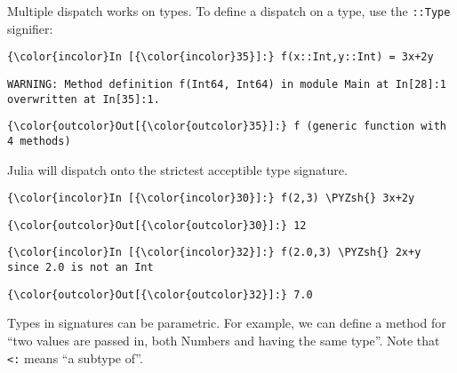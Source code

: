 \documentclass[11pt]{article}
\def\PYZsh{\char`\#}
\begin{document}
Multiple dispatch works on types. To define a dispatch on a type, use
the \texttt{::Type} signifier:

    \begin{Verbatim}[commandchars=\\\{\}]
{\color{incolor}In [{\color{incolor}35}]:} f(x::Int,y::Int) = 3x+2y
\end{Verbatim}

    \begin{Verbatim}[commandchars=\\\{\}]
WARNING: Method definition f(Int64, Int64) in module Main at In[28]:1 overwritten at In[35]:1.

    \end{Verbatim}

            \begin{Verbatim}[commandchars=\\\{\}]
{\color{outcolor}Out[{\color{outcolor}35}]:} f (generic function with 4 methods)
\end{Verbatim}
        
    Julia will dispatch onto the strictest acceptible type signature.

    \begin{Verbatim}[commandchars=\\\{\}]
{\color{incolor}In [{\color{incolor}30}]:} f(2,3) \PYZsh{} 3x+2y
\end{Verbatim}

            \begin{Verbatim}[commandchars=\\\{\}]
{\color{outcolor}Out[{\color{outcolor}30}]:} 12
\end{Verbatim}
        
    \begin{Verbatim}[commandchars=\\\{\}]
{\color{incolor}In [{\color{incolor}32}]:} f(2.0,3) \PYZsh{} 2x+y since 2.0 is not an Int
\end{Verbatim}

            \begin{Verbatim}[commandchars=\\\{\}]
{\color{outcolor}Out[{\color{outcolor}32}]:} 7.0
\end{Verbatim}
        
    Types in signatures can be parametric. For example, we can define a
method for ``two values are passed in, both Numbers and having the same
type''. Note that \texttt{\textless{}:} means ``a subtype of''.
\end{document}
